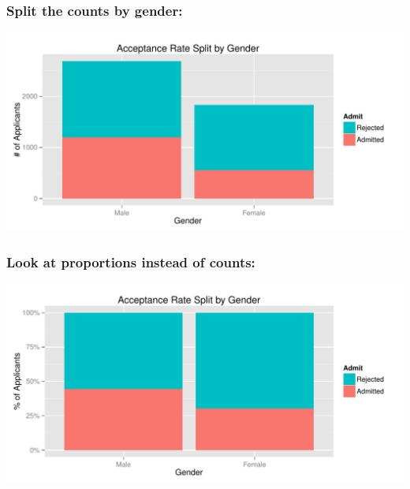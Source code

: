 \documentclass[slides]{beamer}\usepackage[]{graphicx}\usepackage[]{color}
\begin{document}
\begin{frame}
\frametitle{Split the counts by gender:}

\begin{center}
\includegraphics[width=\textwidth]{gender-accpt-count.pdf}
\end{center}

\end{frame}



\begin{frame}
\frametitle{Look at proportions instead of counts:}

\begin{center}
\includegraphics[width=\textwidth]{gender-accpt.pdf}
\end{center}

\end{frame}
\end{document}
